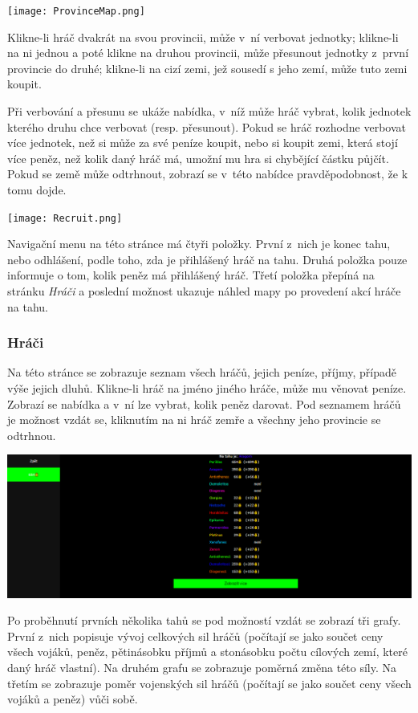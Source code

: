 \documentclass[a4paper,12pt]{article}
\begin{document}
\texttt{[image: ProvinceMap.png]}

Klikne-li hráč dvakrát na svou provincii, může v~ní verbovat jednotky; klikne-li na ni jednou a poté klikne na druhou provincii, může přesunout jednotky z~první provincie do druhé; klikne-li na cizí zemi, jež sousedí s jeho zemí, může tuto zemi koupit.

Při verbování a přesunu se ukáže nabídka, v~níž může hráč vybrat, kolik jednotek kterého druhu chce verbovat (resp. přesunout). Pokud se hráč rozhodne verbovat více jednotek, než si může za své peníze koupit, nebo si koupit zemi, která stojí více peněz, než kolik daný hráč má, umožní mu hra si chybějící částku půjčít. Pokud se země může odtrhnout, zobrazí se v~této nabídce pravděpodobnost, že k tomu dojde.

\texttt{[image: Recruit.png]}

Navigační menu na této stránce má čtyři položky. První z~nich je konec tahu, nebo odhlášení, podle toho, zda je přihlášený hráč na tahu. Druhá položka pouze informuje o tom, kolik peněz má přihlášený hráč. Třetí položka přepíná na stránku \textit{Hráči} a poslední možnost ukazuje náhled mapy po provedení akcí hráče na tahu.
\subsubsection{Hráči}
Na této stránce se zobrazuje seznam všech hráčů, jejich peníze, příjmy, případě výše jejich dluhů. Klikne-li hráč na jméno jiného hráče, může mu věnovat peníze. Zobrazí se nabídka a v~ní lze vybrat, kolik peněz darovat. Pod seznamem hráčů je možnost vzdát se, kliknutím na ni hráč zemře a všechny jeho provincie se odtrhnou.

\includegraphics[width=\textwidth]{Players.png}

Po proběhnutí prvních několika tahů se pod možností vzdát se zobrazí tři grafy. První z~nich popisuje vývoj celkových sil hráčů (počítají se jako součet ceny všech vojáků, peněz, pětinásobku příjmů a stonásobku počtu cílových zemí, které daný hráč vlastní). Na druhém grafu se zobrazuje poměrná změna této síly. Na třetím se zobrazuje poměr vojenských sil hráčů (počítají se jako součet ceny všech vojáků a peněz) vůči sobě.
\end{document}
